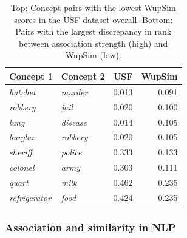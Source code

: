 \documentclass[fullname]{clv2}
\begin{document}
\begin{table}[t]\begin{center}\begin{tabular}{l|l|r|r}
Concept 1 & Concept 2 & USF & WupSim \\
\hline \emph{hatchet} & \emph{murder} & 0.013 & 0.091 \\
\emph{robbery} & \emph{jail} & 0.020 & 0.100 \\
\emph{lung} & \emph{disease} & 0.014 & 0.105 \\
\emph{burglar} & \emph{robbery}& 0.020 & 0.105\\
\hdashline \emph{sheriff} & \emph{police} & 0.333 & 0.133 \\
\emph{colonel} & \emph{army} & 0.303 & 0.111 \\
\emph{quart}& \emph{milk} & 0.462 & 0.235 \\
\emph{refrigerator} & \emph{food} & 0.424 & 0.235\\
\end{tabular}\end{center}\caption{\label{font-table} Top: Concept pairs with the lowest WupSim scores in the USF dataset overall. Bottom: Pairs with the largest discrepancy in rank between association strength (high) and WupSim (low).}\end{table}



\subsubsection{Association and similarity in NLP} 
\end{document}
